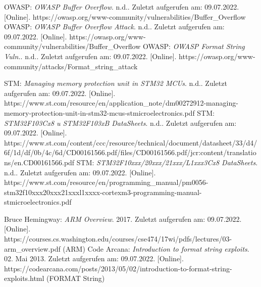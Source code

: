\documentclass[a4paper,
DIV=13,
12pt,
BCOR=10mm,
department=FakIM,
oneside,
parskip=half,
automark,
listof=totocnumbered,
bibliography=totocnumbered,
acronym=totocnumbered
] {OTHRartcl}
\begin{document}
\begin{appendix}
\begin{thebibliography}{99}
  OWASP: \textit{OWASP Buffer Overflow}. n.d.. Zuletzt aufgerufen am: 09.07.2022. [Online]. https://owasp.org/www-community/vulnerabilities/Buffer\_Overflow
  OWASP: \textit{OWASP Buffer Overflow Attack}. n.d.. Zuletzt aufgerufen am: 09.07.2022. [Online]. https://owasp.org/www-community/vulnerabilities/Buffer\_Overflow
  OWASP: \textit{OWASP Format String Vuln.}. n.d.. Zuletzt aufgerufen am: 09.07.2022. [Online]. https://owasp.org/www-community/attacks/Format\_string\_attack


  STM: \textit{Managing memory protection unit in STM32 MCUs}. n.d.. Zuletzt aufgerufen am: 09.07.2022. [Online]. https://www.st.com/resource/en/application\_note/dm00272912-managing-memory-protection-unit-in-stm32-mcus-stmicroelectronics.pdf
  STM: \textit{STM32F103Cx8 u STM32F103xB DataSheets}. n.d.. Zuletzt aufgerufen am: 09.07.2022. [Online]. https://www.st.com/content/ccc/resource/technical/document/datasheet/33/d4/6f/1d/df/0b/4c/6d/CD00161566.pdf/files/CD00161566.pdf/jcr:content/translations/en.CD00161566.pdf
  STM: \textit{STM32F10xxx/20xxx/21xxx/L1xxx3Cx8 DataSheets}. n.d.. Zuletzt aufgerufen am: 09.07.2022. [Online]. https://www.st.com/resource/en/programming\_manual/pm0056-stm32f10xxx20xxx21xxxl1xxxx-cortexm3-programming-manual-stmicroelectronics.pdf

  Bruce Hemingway: \textit{ARM Overview}. 2017. Zuletzt aufgerufen am: 09.07.2022. [Online]. https://courses.cs.washington.edu/courses/cse474/17wi/pdfs/lectures/03-arm\_overview.pdf (ARM)
  Code Arcana: \textit{Introduction to format string exploits}. 02. Mai 2013. Zuletzt aufgerufen am: 09.07.2022. [Online]. https://codearcana.com/posts/2013/05/02/introduction-to-format-string-exploits.html (FORMAT String)


\end{thebibliography}

\cleardoublepage
\makedeclaration
\end{appendix}
\end{document}
